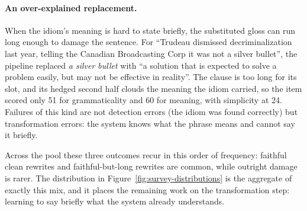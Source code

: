 \paragraph{An over-explained replacement.} When the idiom's meaning is hard to state briefly, the substituted gloss can run long enough to damage the sentence. For ``Trudeau dismissed decriminalization last year, telling the Canadian Broadcasting Corp it was not a silver bullet'', the pipeline replaced \textit{a silver bullet} with ``a solution that is expected to solve a problem easily, but may not be effective in reality''. The clause is too long for its slot, and its hedged second half clouds the meaning the idiom carried, so the item scored only 51 for grammaticality and 60 for meaning, with simplicity at 24. Failures of this kind are not detection errors (the idiom was found correctly) but transformation errors: the system knows what the phrase means and cannot say it briefly.

Across the pool these three outcomes recur in this order of frequency: faithful clean rewrites and faithful-but-long rewrites are common, while outright damage is rarer. The distribution in Figure~\ref{fig:survey-distributions} is the aggregate of exactly this mix, and it places the remaining work on the transformation step: learning to say briefly what the system already understands.

\newpage
